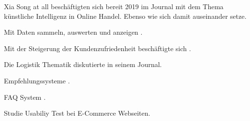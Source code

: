 Xia Song at all beschäftigten sich bereit 2019 im Journal \cite{Song_2019} mit dem Thema künstliche Intelligenz in Online Handel. Ebenso wie \cite{Soni_2020} sich damit auseinander setze.

Mit Daten sammeln, auswerten und anzeigen \cite{Keerthana_2021}.

Mit der Steigerung der Kundenzufriedenheit beschäftigte sich \cite{Wong_2020}.

Die Logistik Thematik diskutierte \cite{Lv_2021} in seinem Journal.

Empfehlungssysteme \cite{Abdul_Hussien_2021}.

FAQ System \cite{Pan_2018}.

Studie Usabiliy Test \cite{Jain_2021} bei E-Commerce Webseiten.